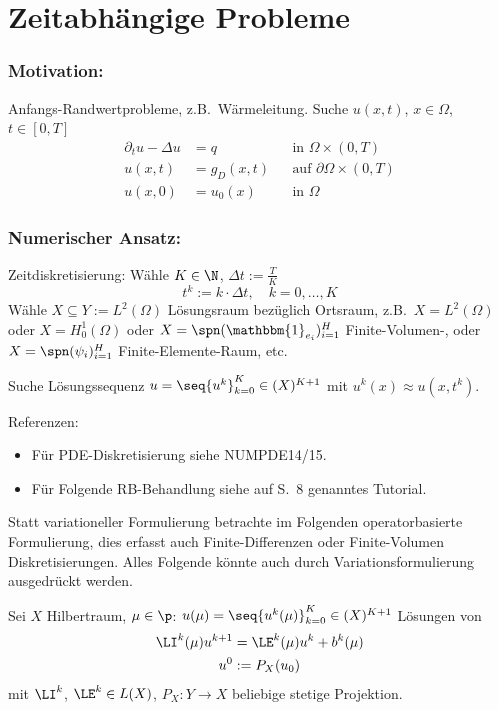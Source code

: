 \section{Zeitabhängige Probleme}
\label{sec-6}

\subsubsection*{Motivation:}
Anfangs-Randwertprobleme, z.B.\ Wärmeleitung. Suche $u(x,t)$, $x \in \Omega$, $t \in [0,T]$
\begin{align*}
	\partial_t u - \Delta u &= q & & \text{in } \Omega \times (0,T) \\
	u(x,t) &= g_D(x,t) & & \text{auf } \partial\Omega \times (0,T) \\
	u(x,0) &= u_0(x) & & \text{in } \Omega
\end{align*}

\subsubsection*{Numerischer Ansatz:}
Zeitdiskretisierung: Wähle $K \in \N$, $\Delta t := \frac{T}{K}$
\[
	t^k := k \cdot \Delta t, \quad k = 0,\ldots,K
\]
Wähle $X \subseteq Y := L^2(\Omega)$ Lösungsraum bezüglich Ortsraum, z.B.\ $X = L^2(\Omega)$ oder $X = H_0^1(\Omega)$ oder $X = \spn(\mathbbm{1}_{e_i})_{i=1}^{H}$ Finite-Volumen-, oder $X = \spn(\psi_i)_{i=1}^H$ Finite-Elemente-Raum, etc.

Suche Lösungssequenz $u = \seq{u^k}_{k=0}^K \in (X)^{K+1}$ mit $u^k(x) \approx u(x,t^k)$.

Referenzen:
\begin{itemize}
	\item Für PDE-Diskretisierung siehe NUMPDE14/15.
	\item Für Folgende RB-Behandlung siehe auf S.\ 8 genanntes Tutorial.
\end{itemize}

\vspace{10pt}

\begin{bem}
	Statt variationeller Formulierung betrachte im Folgenden operatorbasierte Formulierung, dies erfasst auch Finite-Differenzen oder Finite-Volumen Diskretisierungen.
	Alles Folgende könnte auch durch Variationsformulierung ausgedrückt werden.
\end{bem}

\begin{defn}
	Sei $X$ Hilbertraum, $\mu \in \p$: $u(\mu) = \seq{u^k(\mu)}_{k=0}^K \in (X)^{K+1}$ Lösungen von
	\begin{align*}
		\LI^k(\mu) u^{k+1} &= \LE^k(\mu) u^k + b^k(\mu) \\
		u^0 &:= P_X(u_0)
	\end{align*}
	mit $\LI^k$, $\LE^k \in L(X)$, $P_X: Y \to X$ beliebige stetige Projektion.
\end{defn}

